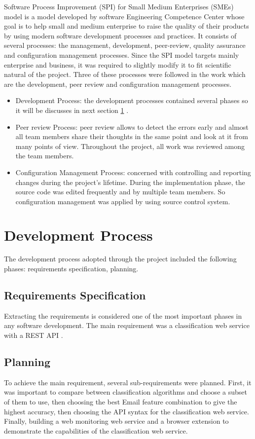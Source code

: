 Software Process Improvement (SPI) for Small Medium Enterprises (SMEs)
model is a model developed by software Engineering Competence Center
whose goal is to help small and medium enterprise to raise the quality of
their products by using modern software development processes and practices. 
It consists of several processes: the management, development, peer-review, 
quality assurance and configuration management processes. Since
the SPI model targets mainly enterprise and business, it was required to
slightly modify it to fit scientific natural of the project. Three of these 
processes were followed in the work which are the development, peer review and
configuration management processes.

\begin{itemize}
  \item Development Process: the development processes contained several
  phases so it will be discusses in next section \ref{sec:5_dev_process} .
  \item Peer review Process: peer review allows to detect the errors early and
  almost all team members share their thoughts in the same point and
  look at it from many points of view. Throughout the project, all work
  was reviewed among the team members.
  \item Configuration Management Process: concerned with controlling and
  reporting changes during the project's lifetime. During the implementation 
  phase, the source code was edited frequently and by multiple
  team members. So configuration management was applied by using
  source control system.
\end{itemize}

\section{Development Process}
\label{sec:5_dev_process}

The development process adopted through the project included the following
phases: requirements specification, planning.

\subsection{Requirements Specification}
Extracting the requirements is considered one of the most important phases
in any software development. The main requirement was a classification web 
service with a REST API \cite{REST}.
\subsection{Planning}
To achieve the main requirement, several sub-requirements were planned.
First, it was important to compare between classification algorithms and choose 
a subset of them to use, then choosing the best Email feature combination to 
give the highest accuracy, then choosing the API syntax for the classification 
web service. Finally, building a web monitoring web service and a browser extension 
to demonstrate the capabilities of the classification web service.
